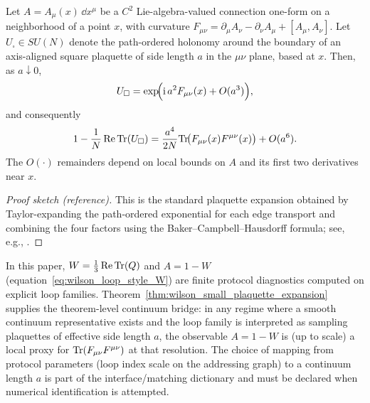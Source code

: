 \begin{theorem}
\label{thm:wilson_small_plaquette_expansion}
\MathTag Let $A=A_\mu(x)\,\dd x^\mu$ be a $C^2$ Lie-algebra-valued connection one-form on a neighborhood of a point $x$,
with curvature $F_{\mu\nu}=\partial_\mu A_\nu-\partial_\nu A_\mu+[A_\mu,A_\nu]$.
Let $U_\square\in SU(N)$ denote the path-ordered holonomy around the boundary of an axis-aligned square plaquette of side length $a$ in the $\mu\nu$ plane, based at $x$.
Then, as $a\downarrow 0$,
\begin{equation}
\label{eq:wilson_small_loop_expansion}
U_\square
=\exp\!\Bigl(\mathrm{i}\,a^{2}F_{\mu\nu}(x) + O(a^{3})\Bigr),
\end{equation}
and consequently
\begin{equation}
\label{eq:wilson_action_density_expansion}
1-\frac{1}{N}\operatorname{Re}\mathrm{Tr}(U_\square)
=\frac{a^{4}}{2N}\mathrm{Tr}\!\bigl(F_{\mu\nu}(x)F^{\mu\nu}(x)\bigr)+O(a^{6}).
\end{equation}
The $O(\cdot)$ remainders depend on local bounds on $A$ and its first two derivatives near $x$.
\end{theorem}

\begin{proof}[Proof sketch (reference)]
This is the standard plaquette expansion obtained by Taylor-expanding the path-ordered exponential for each edge transport and combining the four factors using the Baker--Campbell--Hausdorff formula; see, e.g., \cite{Wilson1974,Rothe2012}.
\end{proof}

\begin{remark}
\label{rem:wilson_proxy_protocol_use}
\InterfaceTag In this paper, $W=\frac13\operatorname{Re}\mathrm{Tr}(Q)$ and $A=1-W$ (equation~\eqref{eq:wilson_loop_style_W}) are finite protocol diagnostics computed on explicit loop families.
Theorem~\ref{thm:wilson_small_plaquette_expansion} supplies the theorem-level continuum bridge:
in any regime where a smooth continuum representative exists and the loop family is interpreted as sampling plaquettes of effective side length $a$, the observable $A=1-W$ is (up to scale) a local proxy for $\mathrm{Tr}(F_{\mu\nu}F^{\mu\nu})$ at that resolution.
The choice of mapping from protocol parameters (loop index scale on the addressing graph) to a continuum length $a$ is part of the interface/matching dictionary and must be declared when numerical identification is attempted.
\end{remark}

